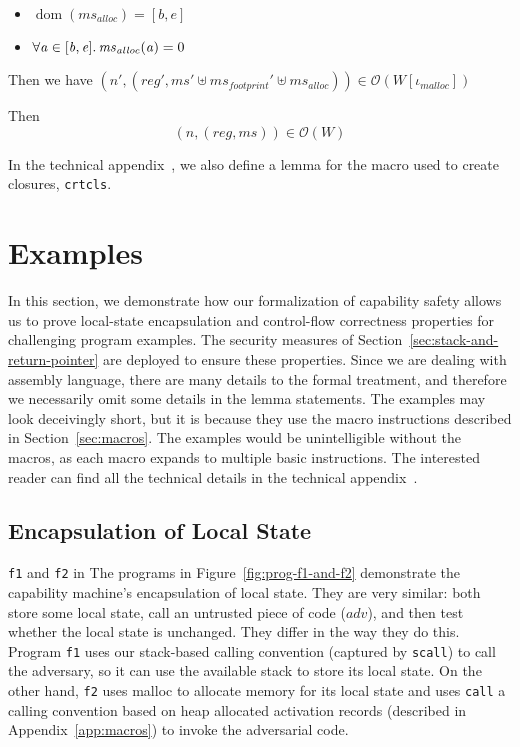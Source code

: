 \documentclass[format=acmsmall, review=true, screen=true]{acmart}
\renewcommand{\figurename}{Figure}
\renewcommand{\sectionname}{Section}
\DeclareMathOperator{\dom}{dom}
\newcommand{\var}[1]{\mathit{#1}}
\newcommand{\hs}{\var{ms}}
\newcommand{\ms}{\hs}
\newcommand{\addr}{\var{a}}
\newcommand{\start}{\var{b}}
\newcommand{\addrend}{\var{e}}
\newcommand{\reg}{\var{reg}}
\newcommand{\adv}{\var{adv}}
\newcommand{\codelabel}[1]{\mathit{#1}}
\newcommand{\malloc}{\codelabel{malloc}}
\newcommand{\observations}{\mathcal{O}}
\newcommand{\npair}[2][n]{\left(#1,#2 \right)}
\newenvironment{toplas}%
    {\color{OliveGreen}}{}
\newcommand{\itoplassug}[1]{}
\begin{document}
\begin{toplas}
\begin{lemma}
\begin{enumerate}
\begin{itemize}
    \item $\dom(\ms_{\var{alloc}}) = [\start,\addrend]$
    \item $\forall \addr \in [\start,\addrend]\ldotp \ms_{\var{alloc}}(\addr) = 0$
    \end{itemize}
    Then we have $\npair[n']{(\reg',\ms' \uplus \ms_{\var{footprint}}'  \uplus \ms_{\var{alloc}})} \in \observations(W[\iota_\malloc])$
  \end{enumerate}
  Then
  \[
    \npair{(\reg,\ms)} \in \observations(W)
  \]
\end{lemma}
In the technical appendix~\citep{technical_appendix}, we also define a lemma for
the macro used to create closures, \texttt{crtcls}.
\end{toplas}

\section{Examples}
\label{sec:examples}
\itoplassug{Suggestion: add a couple of short proof sketches.}
In this section, we demonstrate how our formalization of capability safety
allows us to prove local-state encapsulation and control-flow correctness
properties for challenging program examples. The security measures
of \sectionname~\ref{sec:stack-and-return-pointer} are deployed to ensure these
properties. Since we are dealing with assembly language, there are many details
to the formal treatment, and therefore we necessarily omit some details in the
lemma statements. The examples may look deceivingly short, but it is because
they use the macro instructions described in \sectionname~\ref{sec:macros}.
The examples would be
unintelligible without the macros, as each macro expands to multiple basic instructions. The interested reader can find all the
technical details in the technical appendix~\citep{technical_appendix}.

\subsection{Encapsulation of Local State}
\texttt{f1} and \texttt{f2} in The programs in \figurename~\ref{fig:prog-f1-and-f2} demonstrate the capability machine's encapsulation of local state.
They are very similar: both store some local state, call an untrusted piece of code ($\adv$), and then test whether the local state is unchanged.
They differ in the way they do this.
Program \texttt{f1} uses our stack-based calling convention (captured by \texttt{scall}) to call the adversary, so it can use the available stack to store its local state.
On the other hand, \texttt{f2} uses malloc to allocate memory for its local state and uses \texttt{call} a calling convention based on heap allocated activation records (described in Appendix~\ref{app:macros}) to invoke the adversarial code.
\end{document}
